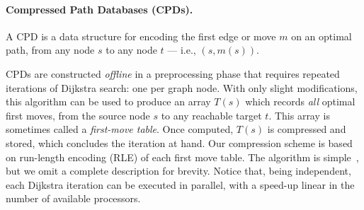 \paragraph{Compressed Path Databases (CPDs).} A CPD is a
data structure for encoding the first edge or move $m$ on
an optimal path, from any node $s$ to any node $t$ --- i.e., $(s,m(s))$.




CPDs are constructed {\em offline} in a preprocessing phase 
that requires repeated iterations of Dijkstra search: 
one per graph node.
With only slight modifications, this algorithm can be used 
to produce an array $T(s)$ which records {\em all} optimal
first moves, from the source node $s$ to any reachable
target $t$. 
This array is sometimes called a {\em first-move table}.
Once computed, $T(s)$ is compressed and stored, which
concludes the iteration at hand.
Our compression scheme is based on run-length
encoding (RLE) of each first move table.
The algorithm is simple~\cite{strasser-et-al-2014}, but we 
omit a complete description for brevity.
Notice that, being independent, each Dijkstra iteration can be 
executed in parallel, with a speed-up linear in the number of
available processors.

